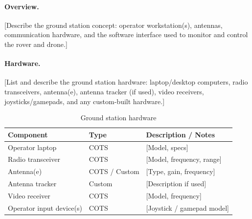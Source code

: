 %

\paragraph{Overview.}
[Describe the ground station concept: operator workstation(s), antennas,
communication hardware, and the software interface used to monitor and control
the rover and drone.]

\paragraph{Hardware.}
[List and describe the ground station hardware: laptop/desktop computers,
radio transceivers, antenna(e), antenna tracker (if used), video receivers,
joysticks/gamepads, and any custom-built hardware.]

\begin{table}[H]
    \centering
    \caption{Ground station hardware}
    \label{tab:gs_hardware}
    \begin{tabular}{L{4cm} L{2cm} L{6cm}}
        \toprule
        \textbf{Component}        & \textbf{Type} & \textbf{Description / Notes} \\
        \midrule
        Operator laptop           & COTS & [Model, specs] \\
        Radio transceiver         & COTS & [Model, frequency, range] \\
        Antenna(e)                & COTS / Custom & [Type, gain, frequency] \\
        Antenna tracker           & Custom & [Description if used] \\
        Video receiver            & COTS & [Model, frequency] \\
        Operator input device(s)  & COTS & [Joystick / gamepad model] \\
        \bottomrule
    \end{tabular}
\end{table}

